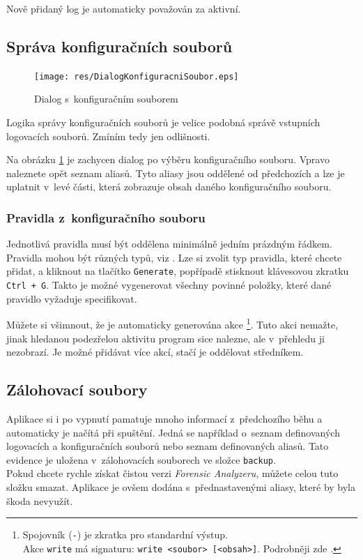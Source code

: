 \documentclass[thesis=B,czech]{FITthesis}[2012/06/26]
\begin{document}
Nově přidaný log je automaticky považován za aktivní.

\subsection{Správa konfiguračních souborů}
\begin{figure}[h]
  \centering
  \texttt{[image: res/DialogKonfiguracniSoubor.eps]}
  \caption{Dialog s~konfiguračním souborem}
  \label{fig:DialogKonfiguracniSoubor}
\end{figure}

Logika správy konfiguračních souborů je velice podobná správě vstupních logovacích souborů. Zmíním tedy jen odlišnosti.

Na obrázku \ref{fig:DialogKonfiguracniSoubor} je zachycen dialog po výběru konfiguračního souboru.
Vpravo naleznete opět seznam aliasů. Tyto aliasy jsou oddělené od předchozích a lze je uplatnit v~levé části, která zobrazuje obsah daného konfiguračního souboru.

\subsubsection{Pravidla z~konfiguračního souboru}
Jednotlivá pravidla musí být oddělena minimálně jedním prázdným řádkem. Pravidla mohou být různých typů, viz \cite{secManPage}. Lze si zvolit typ pravidla, které chcete přidat, a kliknout na tlačítko \texttt{Generate}, popřípadě stisknout klávesovou zkratku \texttt{Ctrl + G}. Takto je možné vygenerovat všechny povinné položky, které dané pravidlo vyžaduje specifikovat. 

Můžete si všimnout, že je automaticky generována akce \footnote{Spojovník (\texttt{-}) je zkratka pro standardní výstup. \\Akce \texttt{write} má signaturu: \texttt{write <soubor> [<obsah>]}. Podrobněji zde \cite{secManPage}.}. Tuto akci nemažte, jinak hledanou podezřelou aktivitu program sice nalezne, ale v~přehledu ji nezobrazí. Je možné přidávat více akcí, stačí je oddělovat středníkem.

\subsection{Zálohovací soubory}
Aplikace si i po vypnutí pamatuje mnoho informací z~předchozího běhu a automaticky je načítá při spuštění. Jedná se například o~seznam definovaných logovacích a konfiguračních souborů nebo seznam definovaných aliasů. Tato evidence je uložena v~zálohovacích souborech ve složce \texttt{backup}. \\Pokud chcete rychle získat čistou verzi \textit{Forensic Analyzeru}, můžete celou tuto složku smazat. Aplikace je ovšem dodána s~přednastavenými aliasy, které by byla  škoda nevyužít.
\end{document}
